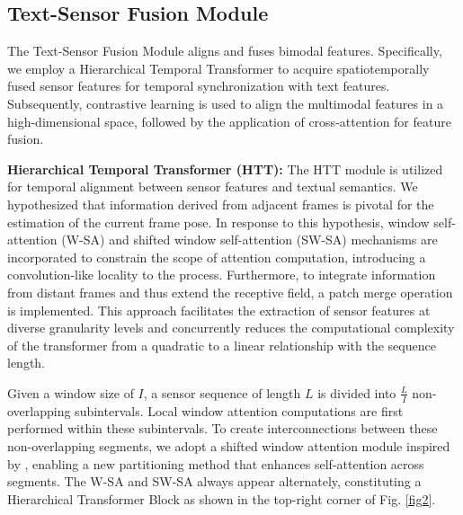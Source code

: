 \documentclass[letterpaper]{article} %
\begin{document}
\subsection{Text-Sensor Fusion Module} 
The Text-Sensor Fusion Module aligns and fuses bimodal features.
Specifically, we employ a Hierarchical Temporal Transformer to acquire spatiotemporally fused sensor features for temporal synchronization with text features. Subsequently, contrastive learning is used to align the multimodal features in a high-dimensional space, followed by the application of cross-attention for feature fusion.

\textbf{Hierarchical Temporal Transformer (HTT):} The HTT module is utilized for temporal alignment between sensor features and textual semantics. We hypothesized that information derived from adjacent frames is pivotal for the estimation of the current frame pose. In response to this hypothesis, window self-attention (W-SA) and shifted window self-attention (SW-SA) mechanisms are incorporated to constrain the scope of attention computation, introducing a convolution-like locality to the process.
Furthermore, to integrate information from distant frames and thus extend the receptive field, a patch merge operation is implemented. This approach facilitates the extraction of sensor features at diverse granularity levels and concurrently reduces the computational complexity of the transformer from a quadratic to a linear relationship with the sequence length.

Given a window size of $I$, a sensor sequence of length $L$ is divided into $\frac{L}{I}$ non-overlapping subintervals. Local window attention computations are first performed within these subintervals. To create interconnections between these non-overlapping segments, we adopt a shifted window attention module inspired by \cite{liu2021swin}, enabling a new partitioning method that enhances self-attention across segments. The W-SA and SW-SA always appear alternately, constituting a Hierarchical Transformer Block as shown in the top-right corner of Fig. \ref{fig2}.
\end{document}
